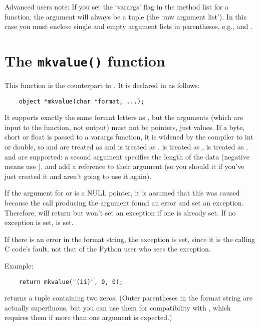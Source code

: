 Advanced users note: If you set the `varargs' flag in the method list
for a function, the argument will always be a tuple (the `raw argument
list').  In this case you must enclose single and empty argument lists
in parentheses, e.g.,  and \samp{()}.


\section{The {\tt mkvalue()} function}

This function is the counterpart to .  It is declared
in  as follows:

\begin{verbatim}
    object *mkvalue(char *format, ...);
\end{verbatim}

It supports exactly the same format letters as , but
the arguments (which are input to the function, not output) must not
be pointers, just values.  If a byte, short or float is passed to a
varargs function, it is widened by the compiler to int or double, so
 and  are treated as  and  is
treated as .   is treated as ,  is
treated as .   and  are supported: a
second argument specifies the length of the data (negative means use
).   and  add a reference to their
argument (so you should  it if you've just created it
and aren't going to use it again).

If the argument for  or  is a NULL pointer, it is
assumed that this was caused because the call producing the argument
found an error and set an exception.  Therefore,  will
return  but won't set an exception if one is already set.
If no exception is set,  is set.

If there is an error in the format string, the 
exception is set, since it is the calling C code's fault, not that of
the Python user who sees the exception.

Example:

\begin{verbatim}
    return mkvalue("(ii)", 0, 0);
\end{verbatim}

returns a tuple containing two zeros.  (Outer parentheses in the
format string are actually superfluous, but you can use them for
compatibility with , which requires them if more than
one argument is expected.)


